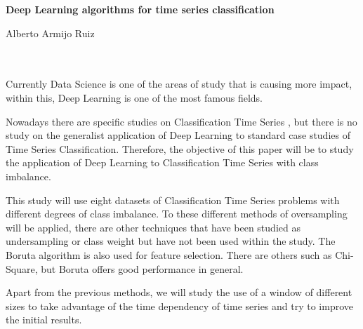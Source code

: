 {\cleardoublepage


\thispagestyle{empty}


\begin{center}
{\large\bfseries Deep Learning algorithms for time series classification}\\
\end{center}
\begin{center}
Alberto Armijo Ruiz \\
\end{center}

\\

\vspace{0.7cm}
\\

Currently Data Science is one of the areas of study that is causing more impact, within this, Deep Learning is one of the most famous fields. \newline

Nowadays there are specific studies on Classification Time Series \cite{cao2013integrated} \cite{cao2014parsimonious} \cite{geng2018cost} \cite{he2017uncertainty} \cite{karim2017lstm} \cite{liang2013effective} \cite{roychoudhury2017cost} \cite{xu2018spatio}, but there is no study on the generalist application of Deep Learning to standard case studies of Time Series Classification. Therefore, the objective of this paper will be to study the application of Deep Learning to Classification Time Series with class imbalance.\newline

This study will use eight datasets of Classification Time Series problems with different degrees of class imbalance. To these different methods of oversampling will be applied, there are other techniques that have been studied as undersampling or class weight but have not been used within the study. The Boruta algorithm is also used for feature selection. There are others such as Chi-Square, but Boruta offers good performance in general.\newline

Apart from the previous methods, we will study the use of a window of different sizes to take advantage of the time dependency of time series and try to improve the initial results.\newline

}
